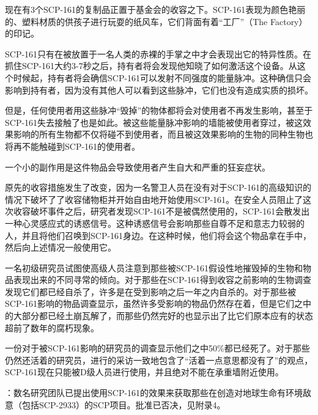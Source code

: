 现在有3个SCP-161的复制品正置于基金会的收容之下。SCP-161表现为颜色艳丽的、塑料材质的供孩子进行玩耍的纸风车，它们背面有着“工厂”（The Factory）的印记。

SCP-161只有在被放置于一名人类的赤裸的手掌之中才会表现出它的特异性质。在抓住SCP-161大约3-7秒之后，持有者将会发现他知晓了如何激活这个设备。从这个时候起，持有者将会确信SCP-161可以发射不同强度的能量脉冲。这种确信只会影响到持有者，因为没有其他人可以看到这些脉冲，它们也没有造成实质的损坏。

但是，任何使用者用这些脉冲“毁掉”的物体都将会对使用者不再发生影响，甚至于SCP-161失去接触了也是如此。被这些能量脉冲影响的墙能被使用者穿过，被这效果影响的所有生物都不仅将碰不到使用者，而且被这效果影响的生物的同种生物也将再不能触碰到SCP-161的使用者。

一个小的副作用是这件物品会导致使用者产生自大和严重的狂妄症状。

原先的收容措施发生了改变，因为一名警卫人员在没有对于SCP-161的高级知识的情况下破坏了了收容储物柜并开始自由地开始使用SCP-161。在安全人员阻止了这次收容破坏事件之后，研究者发现SCP-161不是被偶然使用的，SCP-161会散发出一种心灵感应式的诱惑信号。这种诱惑信号会影响那些自尊不足和意志力较弱的人，并且将他们召唤到SCP-161身边。在这种时候，他们将会这个物品拿在手中，然后向上述情况一般使用它。

一名初级研究员试图使高级人员注意到那些被SCP-161假设性地摧毁掉的生物和物品表现出来的不同寻常的倾向。对于那些在SCP-161得到收容之前影响的生物调查发现它们都已经自杀了，许多是在受到影响之后一年之内自杀的。对于那些被SCP-161影响的物品调查显示，虽然许多受影响的物品仍然存在着，但是它们之中的大部分都已经土崩瓦解了，而那些仍然完好的也显示出了比它们原本应有的状态超前了数年的腐朽现象。

一份对于被SCP-161影响的研究员的调查显示他们之中50\%都已经死了。对于那些仍然还活着的研究员，进行的采访一致地包含了“活着一点意思都没有了”的观点，SCP-161现在只能被D级人员进行使用，并且绝对不能在承重墙附近使用。

：数名研究团队已提出使用SCP-161的效果来获取那些在创造对地球生命有环境敌意（包括SCP-2933）的SCP项目。批准已否决，见附录4。
